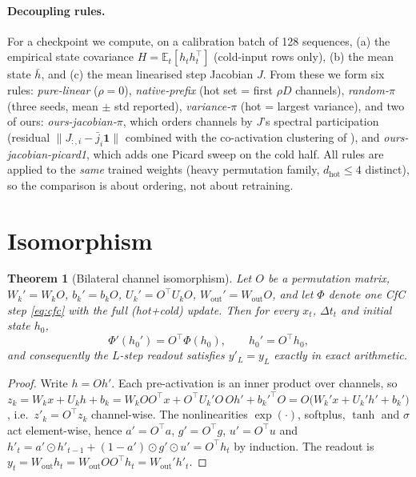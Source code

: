 \documentclass[11pt]{article}
\newtheorem{theorem}{Theorem}
\theoremstyle{definition}
\newcommand{\code}[1]{\texttt{\detokenize{#1}}}
\begin{document}
\paragraph{Decoupling rules.} For a checkpoint we compute, on a calibration batch of 128 sequences,
(a) the empirical state covariance $H = \mathbb{E}_t[h_th_t^\top]$ (cold-input rows only),
(b) the mean state $\bar h$, and (c) the mean linearised step Jacobian $J$. From these we form six rules:
\emph{pure-linear} ($\rho=0$), \emph{native-prefix} (hot set = first $\rho D$ channels), \emph{random-$\pi$}
(three seeds, mean $\pm$ std reported), \emph{variance-$\pi$} (hot = largest variance), and two of ours:
\emph{ours-jacobian-$\pi$}, which orders channels by $J$'s spectral participation (residual
$\|J_{:,i}-\bar j_i\mathbf{1}\|$ combined with the co-activation clustering of \code{src/ordering.py}), and
\emph{ours-jacobian-picard1}, which adds one Picard sweep on the cold half. All rules are applied to the
\emph{same} trained weights (heavy permutation family, $d_{\text{hot}} \le 4$ distinct), so the comparison is
about ordering, not about retraining.

\section{Isomorphism}\label{sec:iso}

\begin{theorem}[Bilateral channel isomorphism]\label{thm:iso}
Let $O$ be a permutation matrix, $W_k' = W_kO$, $b_k'=b_kO$, $U_k' = O^\top U_kO$, $W_{\text{out}}' =
W_{\text{out}}O$, and let $\Phi$ denote one CfC step \eqref{eq:cfc} with the full (hot+cold) update. Then for
every $x_t$, $\Delta t_t$ and initial state $h_0$,
\[
\Phi'(h_0') = O^\top \Phi(h_0), \qquad h_0' = O^\top h_0,
\]
and consequently the $L$-step readout satisfies $y'_L = y_L$ exactly in exact arithmetic.
\end{theorem}

\begin{proof}
Write $h = Oh'$. Each pre-activation is an inner product over channels, so
$z_k = W_kx + U_kh + b_k = W_kOO^\top x + O^\top U_k' O\,Oh' + b_k'^\top O = O\big(W_k'x + U_k'h' + b_k'\big)$,
i.e.\ $z'_k = O^\top z_k$ channel-wise. The nonlinearities $\exp(\cdot)$, softplus, $\tanh$ and $\sigma$ act
element-wise, hence $a'=O^\top a$, $g'=O^\top g$, $u'=O^\top u$ and
$h'_t = a'\odot h'_{t-1} + (1-a')\odot g'\odot u' = O^\top h_t$ by induction. The readout is
$y_t = W_{\text{out}}h_t = W_{\text{out}}OO^\top h_t = W_{\text{out}}' h'_t$.
\end{proof}
\end{document}
